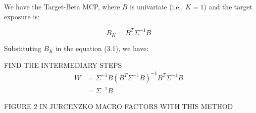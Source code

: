 We have the Target-Beta MCP, where 
$B$ is univariate (i.e., $K = 1$) and the
target exposure is:

\begin{equation}
    B_K = B^T \Sigma^{-1} B
\end{equation}

Substituting $B_K$ in the equation (3.1), we have:

FIND THE INTERMEDIARY STEPS
\begin{equation}
    \begin{aligned}
        W &= \Sigma^{-1} B (B^T \Sigma^{-1} B)^{-1} B^T \Sigma^{-1} B \\
        &= \Sigma^{-1} B
    \end{aligned}
\end{equation}


FIGURE 2 IN JURCENZKO MACRO FACTORS WITH THIS METHOD